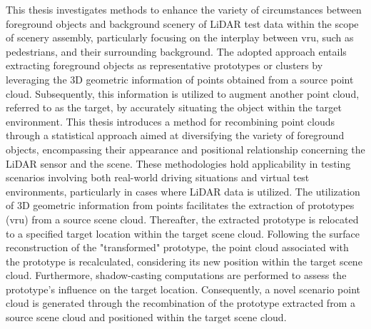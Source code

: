 This thesis investigates methods to enhance the variety of circumstances between foreground objects and background scenery of LiDAR test data within the scope of scenery assembly, particularly focusing on the interplay between \acrfull{vru}, such as pedestrians, and their surrounding background. The adopted approach entails extracting foreground objects as representative prototypes or clusters by leveraging the 3D geometric information of points obtained from a source point cloud. Subsequently, this information is utilized to augment another point cloud, referred to as the target, by accurately situating the object within the target environment. This thesis introduces a method for recombining point clouds through a statistical approach aimed at diversifying the variety of foreground objects, encompassing their appearance and positional relationship concerning the LiDAR sensor and the scene. These methodologies hold applicability in testing scenarios involving both real-world driving situations and virtual test environments, particularly in cases where LiDAR data is utilized. The utilization of 3D geometric information from points facilitates the extraction of prototypes (\acrshort{vru}) from a source scene cloud. Thereafter, the extracted prototype is relocated to a specified target location within the target scene cloud. Following the surface reconstruction of the "transformed" prototype, the point cloud associated with the prototype is recalculated, considering its new position within the target scene cloud. Furthermore, shadow-casting computations are performed to assess the prototype's influence on the target location. Consequently, a novel scenario point cloud is generated through the recombination of the prototype extracted from a source scene cloud and positioned within the target scene cloud.
